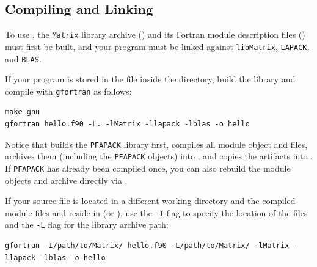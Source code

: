 \subsection{Compiling and Linking}
\label{subsec:compiling}

To use , the \texttt{Matrix} library archive () and its Fortran module description files () must first be built, and your program must be linked against \texttt{libMatrix}, \texttt{LAPACK}, and \texttt{BLAS}.

If your program is stored in the file  inside the  directory, build the library and compile with \texttt{gfortran} as follows:
\lstset{language=bash}
\begin{lstlisting}
make gnu
gfortran hello.f90 -L. -lMatrix -llapack -lblas -o hello
\end{lstlisting}
Notice that  builds the \texttt{PFAPACK} library first, compiles all module object and  files, archives them (including the \texttt{PFAPACK} objects) into , and copies the artifacts into . If \texttt{PFAPACK} has already been compiled once, you can also rebuild the module objects and archive directly via .

If your source file  is located in a different working directory and the compiled module files and  reside in  (or ), use the \texttt{-I} flag to specify the location of the  files and the \texttt{-L} flag for the library archive path:
\lstset{language=bash}
\begin{lstlisting}
gfortran -I/path/to/Matrix/ hello.f90 -L/path/to/Matrix/ -lMatrix -llapack -lblas -o hello
\end{lstlisting}


